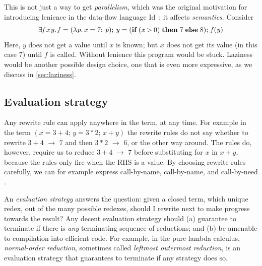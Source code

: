 \documentclass[acmsmall,review,anonymous,dvipsnames]{acmart}
\newcommand{\Varid}[1]{\mathit{#1}}
\begin{document}
This is not just a way to get \emph{parallelism}, which was the original motivation for introducing
lenience in the data-flow language Id~\cite{lenience}; it affects
\emph{semantics}. Consider
$$
\ensuremath{\exists\Varid{f}\hspace{0.3mm}\Varid{x}\hspace{0.3mm}\Varid{y}.\,\Varid{f}\mathrel{=}(\lambda\Varid{p}.\,\Varid{x}\mathrel{=}\mathrm{7};\,\Varid{p});\,\Varid{y}\mathrel{=}(\textbf{if}\;(\Varid{x}\mathbin{>}\mathrm{0})\;\textbf{then}\;\mathrm{7}\;\textbf{else}\;\mathrm{8});\,\Varid{f}(\Varid{y})}
$$
Here, \ensuremath{\Varid{y}} does not get a value until \ensuremath{\Varid{x}} is known; but \ensuremath{\Varid{x}} does not get its
value (in this case \ensuremath{\mathrm{7}}) until \ensuremath{\Varid{f}} is called.  Without lenience this program would be stuck.
Laziness would be another possible design choice, one that is even more expressive, as we discuss in
\cref{sec:laziness}.

\subsection{Evaluation strategy} \label{sec:eval-strategy}

Any rewrite rule can apply anywhere in the term, at any time.  For example in the term \ensuremath{(\Varid{x}\mathrel{=}\mathrm{3}\mathbin{+}\mathrm{4};\,\Varid{y}\mathrel{=}\mathrm{3}\mathbin{*}\mathrm{2};\,\Varid{x}\mathbin{+}\Varid{y})}
the rewrite rules do not say whether to rewrite \ensuremath{\mathrm{3}\mathbin{+}\mathrm{4}} $\rightarrow$ \ensuremath{\mathrm{7}} and then \ensuremath{\mathrm{3}\mathbin{*}\mathrm{2}} $\rightarrow$ \ensuremath{\mathrm{6}},
or the other way around.
The rules do, however, require us to reduce \ensuremath{\mathrm{3}\mathbin{+}\mathrm{4}} $\rightarrow$ \ensuremath{\mathrm{7}} before substituting for \ensuremath{\Varid{x}} in \ensuremath{\Varid{x}\mathbin{+}\Varid{y}}, because
the  rules only fire when the RHS is a value.
By choosing rewrite rules carefully, we can for example express call-by-name,
call-by-name, and call-by-need
\cite{ariola:call-by-need}.

An \emph{evaluation strategy} answers the question: given a closed term, which unique redex,
out of the many possible redexes, should I rewrite next to make progress towards the result?
Any decent evaluation strategy should (a) guarantee to terminate if there
is \emph{any} terminating sequence of reductions; and (b) be amenable
to compilation into efficient code.
For example, in the pure lambda calculus, \emph{normal-order reduction},
sometimes called \emph{leftmost outermost reduction}, is an evaluation strategy that
guarantees to terminate if any strategy does so.
\end{document}
